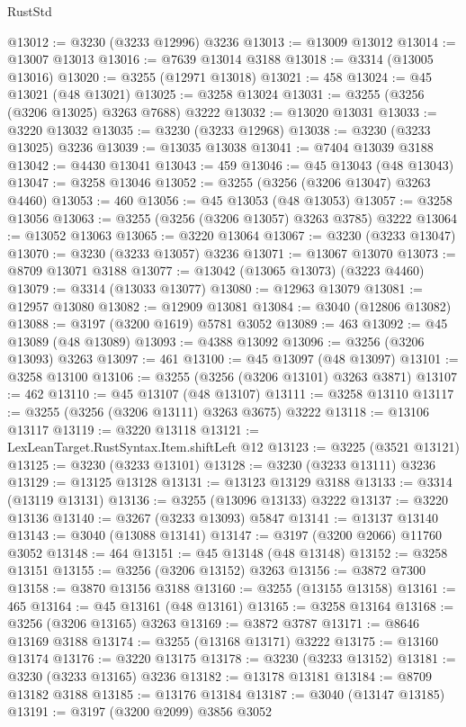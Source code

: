 \begin{lexlean}{RustStd}
\begin{coremodule}
@13012 := @3230 (@3233 @12996) @3236
@13013 := @13009 @13012
@13014 := @13007 @13013
@13016 := @7639 @13014 @3188
@13018 := @3314 (@13005 @13016)
@13020 := @3255 (@12971 @13018)
@13021 := 458
@13024 := @45 @13021 (@48 @13021)
@13025 := @3258 @13024
@13031 := @3255 (@3256 (@3206 @13025) @3263 @7688) @3222
@13032 := @13020 @13031
@13033 := @3220 @13032
@13035 := @3230 (@3233 @12968)
@13038 := @3230 (@3233 @13025) @3236
@13039 := @13035 @13038
@13041 := @7404 @13039 @3188
@13042 := @4430 @13041
@13043 := 459
@13046 := @45 @13043 (@48 @13043)
@13047 := @3258 @13046
@13052 := @3255 (@3256 (@3206 @13047) @3263 @4460)
@13053 := 460
@13056 := @45 @13053 (@48 @13053)
@13057 := @3258 @13056
@13063 := @3255 (@3256 (@3206 @13057) @3263 @3785) @3222
@13064 := @13052 @13063
@13065 := @3220 @13064
@13067 := @3230 (@3233 @13047)
@13070 := @3230 (@3233 @13057) @3236
@13071 := @13067 @13070
@13073 := @8709 @13071 @3188
@13077 := @13042 (@13065 @13073) (@3223 @4460)
@13079 := @3314 (@13033 @13077)
@13080 := @12963 @13079
@13081 := @12957 @13080
@13082 := @12909 @13081
@13084 := @3040 (@12806 @13082)
@13088 := @3197 (@3200 @1619) @5781 @3052
@13089 := 463
@13092 := @45 @13089 (@48 @13089)
@13093 := @4388 @13092
@13096 := @3256 (@3206 @13093) @3263
@13097 := 461
@13100 := @45 @13097 (@48 @13097)
@13101 := @3258 @13100
@13106 := @3255 (@3256 (@3206 @13101) @3263 @3871)
@13107 := 462
@13110 := @45 @13107 (@48 @13107)
@13111 := @3258 @13110
@13117 := @3255 (@3256 (@3206 @13111) @3263 @3675) @3222
@13118 := @13106 @13117
@13119 := @3220 @13118
@13121 := LexLeanTarget.RustSyntax.Item.shiftLeft @12
@13123 := @3225 (@3521 @13121)
@13125 := @3230 (@3233 @13101)
@13128 := @3230 (@3233 @13111) @3236
@13129 := @13125 @13128
@13131 := @13123 @13129 @3188
@13133 := @3314 (@13119 @13131)
@13136 := @3255 (@13096 @13133) @3222
@13137 := @3220 @13136
@13140 := @3267 (@3233 @13093) @5847
@13141 := @13137 @13140
@13143 := @3040 (@13088 @13141)
@13147 := @3197 (@3200 @2066) @11760 @3052
@13148 := 464
@13151 := @45 @13148 (@48 @13148)
@13152 := @3258 @13151
@13155 := @3256 (@3206 @13152) @3263
@13156 := @3872 @7300
@13158 := @3870 @13156 @3188
@13160 := @3255 (@13155 @13158)
@13161 := 465
@13164 := @45 @13161 (@48 @13161)
@13165 := @3258 @13164
@13168 := @3256 (@3206 @13165) @3263
@13169 := @3872 @3787
@13171 := @8646 @13169 @3188
@13174 := @3255 (@13168 @13171) @3222
@13175 := @13160 @13174
@13176 := @3220 @13175
@13178 := @3230 (@3233 @13152)
@13181 := @3230 (@3233 @13165) @3236
@13182 := @13178 @13181
@13184 := @8709 @13182 @3188
@13185 := @13176 @13184
@13187 := @3040 (@13147 @13185)
@13191 := @3197 (@3200 @2099) @3856 @3052

\end{coremodule}
\end{lexlean}
